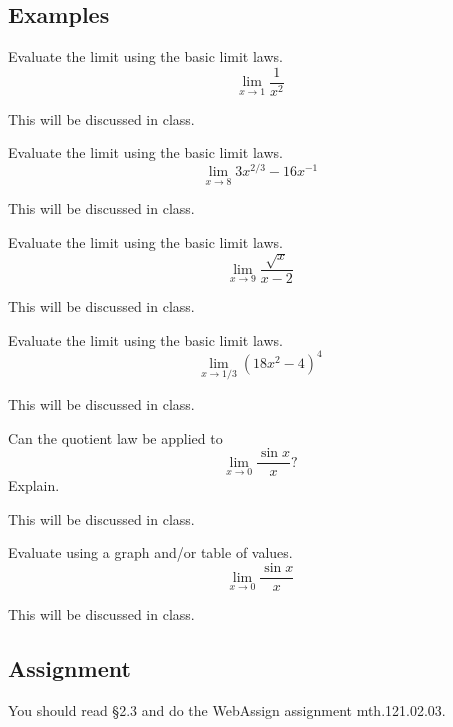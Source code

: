 \documentclass[12pt,addpoints, answers, fleqn]{exam}
\begin{document}
\subsection{Examples}
\begin{questions}
\question Evaluate the limit using the basic limit laws.
\[
\lim_{x \to 1} \frac{1}{x^2}
\]
\begin{solution}
This will be discussed in class.
\end{solution}

\question Evaluate the limit using the basic limit laws.
\[
\lim_{x \to 8} 3x^{2/3}-16x^{-1}
\]
\begin{solution}
This will be discussed in class.
\end{solution}


\question Evaluate the limit using the basic limit laws.
\[
\lim_{x \to 9} \frac{\sqrt{x}}{x-2}
\]
\begin{solution}
This will be discussed in class.
\end{solution}


\question Evaluate the limit using the basic limit laws.
\[
\lim_{x \to 1/3} \left(18x^2-4\right)^4
\]
\begin{solution}
This will be discussed in class.
\end{solution}


\question Can the quotient law be applied to
\[
\lim_{x \to 0} \frac{\sin x}{x}?
\]
Explain.
\begin{solution}
This will be discussed in class.
\end{solution}


\question Evaluate using a graph and/or table of values.
\[
\lim_{x \to 0} \frac{\sin x}{x}
\]
\begin{solution}
This will be discussed in class.
\end{solution}

\end{questions}










\subsection{Assignment}
You should read \S  2.3 and do the WebAssign assignment mth.121.02.03.
\vfill
\pagebreak
\end{document}
